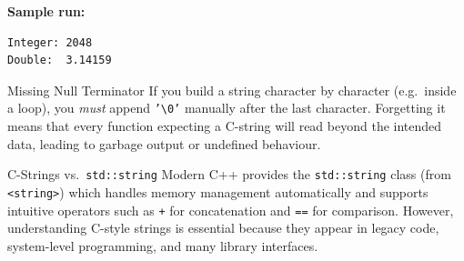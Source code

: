\noindent
\textbf{Sample run:}
\begin{verbatim}
Integer: 2048
Double:  3.14159
\end{verbatim}

\begin{warningbox}{Missing Null Terminator}
If you build a string character by character (e.g.\ inside a loop),
you \emph{must} append \texttt{'\textbackslash 0'} manually after the
last character.  Forgetting it means that every function expecting a
C-string will read beyond the intended data, leading to garbage output
or undefined behaviour.
\end{warningbox}

\begin{conceptbox}{C-Strings vs.\ \texttt{std::string}}
Modern C++ provides the \texttt{std::string} class (from
\texttt{<string>}) which handles memory management automatically and
supports intuitive operators such as \texttt{+} for concatenation and
\texttt{==} for comparison.  However, understanding C-style strings is
essential because they appear in legacy code, system-level
programming, and many library interfaces.
\end{conceptbox}
